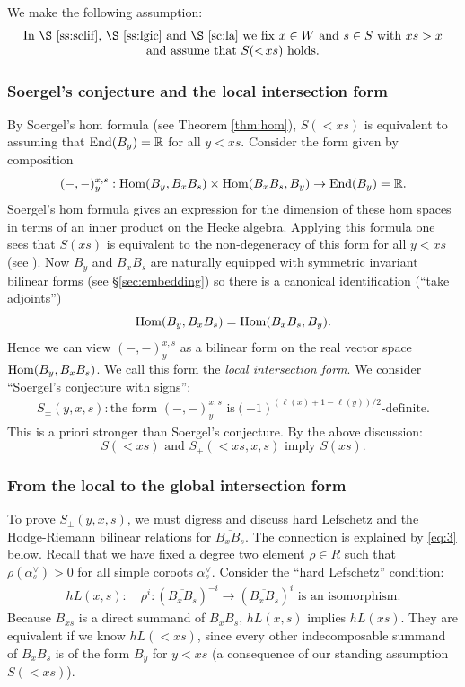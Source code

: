 \documentclass[11pt]{amsart}
\numberwithin{equation}{section}
\def\BS{{\EuScript B}}
\def\a{\alpha}
\def\ov{\overline}
\def\to{\rightarrow}
\DeclareMathOperator{\End}{End} %
\theoremstyle{definition}
\theoremstyle{remark}
\begin{document}
We make the following assumption:
\begin{equation}
\begin{matrix} \text{In \S \ref{ss:sclif}, \S
\ref{ss:lgic} and \S \ref{sc:la} we fix $x \in W$ and $s \in S$ with
$xs > x$} \\
\text{and assume that $S(<\!xs)$ holds.}
\end{matrix}
\end{equation}
\subsubsection{Soergel's conjecture and the local intersection form} \label{ss:sclif}
By Soergel's hom formula (see Theorem \ref{thm:hom}), $S(<\!xs)$ is
equivalent to assuming that $\End(B_y) = \RM$ for all $y <
xs$. Consider the 
form given by composition \[ (-,-)_y^{x,s}: \Hom(B_y, B_xB_s) \times
\Hom(B_xB_s, B_y) \to \End(B_y) = \RM. \] Soergel's hom formula gives
an expression for the dimension of these hom spaces in terms of an
inner product on the Hecke algebra.  Applying this formula one sees that $S(xs)$ is
equivalent to the non-degeneracy of this form for all $y < xs$ (see
\cite[Lemma 7.1(2)]{S3}). Now $B_y$ and $B_xB_s$ are naturally
equipped with symmetric invariant bilinear forms (see \S \ref{sec:embedding}) so there is a
canonical identification (``take adjoints'') \[ \operatorname{Hom}(B_y, B_xB_s) =
\operatorname{Hom}(B_xB_s, B_y). \] Hence  we can view $(-,-)_y^{x,s}$ as a bilinear form on the real vector space
$\operatorname{Hom}(B_y, B_xB_s)$. We call this form the \emph{local intersection form}. We consider ``Soergel's conjecture with signs'': \begin{gather*} S_{\pm}(y,x,s): \text{the form $(-,-)_y^{x,s}$ is
$(-1)^{(\ell(x)+1-\ell(y))/2}$-definite.} \end{gather*} This is a
priori stronger than Soergel's conjecture. By the above discussion:
\begin{equation}
  \label{eq:2}
  \text{$S(<\!xs)$ and $S_{\pm}(<\!xs,x,s)$ imply $S(xs)$.}
\end{equation}

\subsubsection{From the local to the global intersection form} \label{ss:lgic}
To prove $S_{\pm}(y,x,s)$, we must digress and discuss hard
Lefschetz and the Hodge-Riemann bilinear relations for 
$\overline{B_xB_s}$. The connection is explained by \eqref{eq:3} below.
Recall that we have fixed a degree two element $\rho \in R$ such that
$\rho(\a^\vee_s) > 0$ for all simple coroots $\a_s^\vee$. Consider the
``hard Lefschetz'' condition: \begin{gather*} hL(x,s): \quad 
  \text{$\rho^i : (\ov{B_xB_s})^{-i} \to (\ov{B_xB_s})^i$ is an
isomorphism.} \end{gather*} Because $B_{xs}$ is a direct summand of
$B_xB_s$, $hL(x,s)$ implies $hL(xs)$. They are equivalent if we know
$hL(<\!xs)$, since every other indecomposable summand of
$B_x B_s$ is of the form $B_y$ for $y<xs$ (a consequence of
our standing assumption $S(<\!xs)$).
\end{document}
